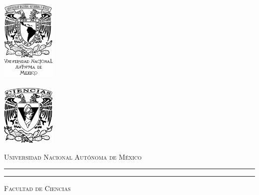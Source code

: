 
\begin{titlepage}
  \vspace*{1.5cm}
  \hskip-0.5cm
  \begin{minipage}[c][10cm][s]{3cm}
    \begin{center}
      \includegraphics[width=2.6cm]{unamf}\\[10pt]
      \hskip2pt\vrule width2pt height13cm\hskip1mm
      \vrule width1pt height13cm\\[10pt]
      \includegraphics[width=2.6cm]{cienciasf}
    \end{center}
  \end{minipage}\quad
  \begin{minipage}[c][9.5cm][s]{10cm}
    \begin{center}
      {\large \scshape Universidad Nacional Autónoma de México}
      \vspace{.3cm}
      \hrule height2pt
      \vspace{.1cm}
      \hrule height1pt
      \vspace{.3cm}
      {\scshape Facultad de Ciencias}

      \vspace{3cm}

      {\Large \eltitulo}

      \vspace{3cm}


\end{center}
\end{minipage}
\end{titlepage}
